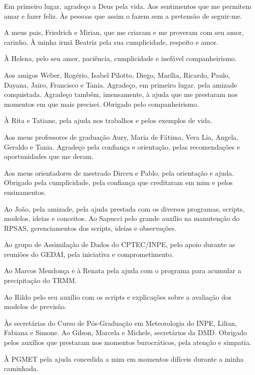 \begin{agradecimentos}
\hypertarget{estilo:agradecimentos}{}

Em primeiro lugar, agradeço a Deus pela vida. Aos sentimentos que me permitem amar e fazer feliz. Às pessoas que assim o fazem sem a pretensão de seguir-me.

A meus pais, Friedrich e Mirian, que me criaram e me proveram com seu amor, carinho. À minha irmã Beatriz pela sua cumplicidade, respeito e amor.

À Helena, pelo seu amor, paciência, cumplicidade e inefável companheirismo.

Aos amigos Weber, Rogério, Isabel Pilotto, Diego, Marília, Ricardo, Paulo, Dayana, Jairo, Francisco e Tania. Agradeço, em primeiro lugar, pela amizade conquistada. Agradeço também, imensamente, à ajuda que me prestaram nos momentos em que mais precisei. Obrigado pelo companheirismo.

À Rita e Tatiane, pela ajuda nos trabalhos e pelos exemplos de vida.

Aos meus professores de graduação Aury, Maria de Fátima, Vera Lia, Angela, Geraldo e Tania. Agradeço pela confiança e orientação, pelas recomendações e oportunidades que me deram.

Aos meus orientadores de mestrado Dirceu e Pablo, pela orientação e ajuda. Obrigado pela cumplicidade, pela confiança que creditaram em mim e pelos ensinamentos.

Ao João, pela amizade, pela ajuda prestada com os diversos programas, scripts, modelos, ideias e conceitos. Ao Sapucci pelo grande auxílio na manutenção do RPSAS, gerenciamentos dos scripts, ideias e observações.

Ao grupo de Assimilação de Dados do CPTEC/INPE, pelo apoio durante as reuniões do GEDAI, pela iniciativa e comprometimento.

Ao Marcos Mendonça e à Renata pela ajuda com o programa para acumular a precipitação do TRMM.

Ao Rildo pelo seu auxílio com os scripts e explicações sobre a avaliação dos modelos de previsão.

Às secretárias do Curso de Pós-Graduação em Meteorologia do INPE, Lilian, Fabiana e Simone. Ao Gilson, Marcela e Michele, secretários da DMD. Obrigado pelos auxílios que prestaram nos momentos burocráticos, pela atenção e simpatia.

À PGMET pela ajuda concedida a mim em momentos difíceis durante a minha caminhada.


\end{agradecimentos}
